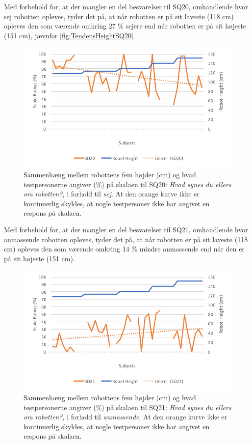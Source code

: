 \noindent
%
Med forbehold for, at der mangler en del besvarelser til SQ20, omhandlende hvor sej robotten opleves, tyder det på, at når robotten er på sit laveste (118 cm) opleves den som værende omkring 27 \% sejere end når robotten er på sit højeste (151 cm), jævnfør \autoref{fig:TendensHeightSQ20}.
%
\begin{figure}[H]
\centering
\includegraphics[width=\textwidth]{Figure/DatabehandlingSkalaer/TendensHeight/HeightSQ20}
\caption{Sammenhæng mellem robottens fem højder (cm) og hvad testpersonerne angiver (\%) på skalaen til SQ20: \textit{Hvad synes du ellers om robotten?}, i forhold til \textit{sej}. At den orange kurve ikke er kontinuerlig skyldes, at nogle testpersoner ikke har angivet en respons på skalaen.}
\label{fig:TendensHeightSQ20}
\end{figure}
\noindent
%
Med forbehold for, at der mangler en del besvarelser til SQ21, omhandlende hvor anmassende robotten opleves, tyder det på, at når robotten er på sit laveste (118 cm) opleves den som værende omkring 14 \% mindre anmassende end når den er på sit højeste (151 cm).
%
\begin{figure}[H]
\centering
\includegraphics[width=\textwidth]{Figure/DatabehandlingSkalaer/TendensHeight/HeightSQ21}
\caption{Sammenhæng mellem robottens fem højder (cm) og hvad testpersonerne angiver (\%) på skalaen til SQ21: \textit{Hvad synes du ellers om robotten?}, i forhold til \textit{anmassende}. At den orange kurve ikke er kontinuerlig skyldes, at nogle testpersoner ikke har angivet en respons på skalaen.}
\label{fig:TendensHeightSQ21}
\end{figure}
